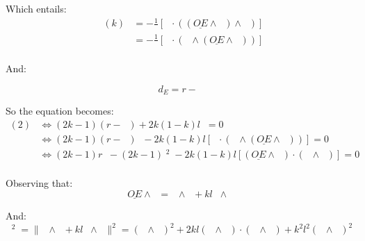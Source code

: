 \documentclass[10pt,a4paper]{article}
\newcommand{\ud}[1]{\underline{#1}}
\DeclareMathOperator{\cross}{\wedge}
\DeclareMathOperator{\OA}{\ud{OA}}
\DeclareMathOperator{\z}{\ud{z}}
\DeclareMathOperator{\e}{\ud{e}}
\DeclareMathOperator{\en}{\ud{e}\cdot\ud{n}}
\DeclareMathOperator{\OEz}{\|\ud{OE} \cross \z\|}
\begin{document}
Which entails:
$$
\begin{array}{ll}
    \en(k)
    & = - \frac{1}{\OEz}\left[ \e \cdot ((\ud{OE}\cross\z) \cross \z)\right]\\
    & = - \frac{1}{\OEz}\left[ \z \cdot (\e \cross (\ud{OE}\cross\z))\right]\\
\end{array}
$$

And:

$$
d_E = r - \OEz
$$

So the equation becomes:
$$
\begin{array}{ll}
    (2)
    & \Leftrightarrow
    (2k-1)(r - \OEz) + 2k(1-k)l\en = 0\\
    & \Leftrightarrow
    (2k-1)(r - \OEz)\OEz
    - 2k(1-k)l\left[ \z \cdot (\e \cross (\ud{OE}\cross\z))\right] = 0\\
    & \Leftrightarrow
    (2k-1)r\OEz - (2k-1)\OEz^2
    - 2k(1-k)l\left[ (\ud{OE}\cross\z) \cdot (\z \cross \e)\right] = 0\\
\end{array}
$$

Observing that:
$$
\ud{OE}\cross\z = \OA \cross \z + kl \e \cross \z
$$

And:
$$
\OEz^2 = \|\OA\cross\z + kl\e\cross\z\|^2
= (\OA\cross\z)^2 + 2kl(\OA\cross\z)\cdot(\e\cross\z) + k^2l^2(\e\cross\z)^2
$$
\end{document}
